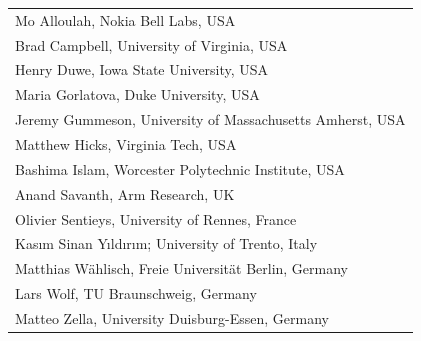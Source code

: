 \documentclass[a4paper,10pt]{scrartcl}
\begin{document}
\begin{minipage}{.49\textwidth}
\begin{tcolorbox}[boxsep=0pt, top=2mm, left=2mm, right=2mm, bottom=0mm, arc=5pt, auto outer arc, colback=cfp_lightcolor, colframe=white]
  \vskip1mm
  \begin{tabular}{l}
Mo Alloulah, Nokia Bell Labs, USA \\
Brad Campbell, University of Virginia, USA \\
Henry Duwe, Iowa State University, USA \\
Maria Gorlatova, Duke University, USA \\
Jeremy Gummeson, University of Massachusetts Amherst, USA \\
Matthew Hicks, Virginia Tech, USA \\
Bashima Islam, Worcester Polytechnic Institute, USA \\
Anand Savanth, Arm Research, UK \\
Olivier Sentieys, University of Rennes, France \\
Kasım Sinan Yıldırım; University of Trento, Italy \\
Matthias Wählisch, Freie Universität Berlin, Germany \\
Lars Wolf, TU Braunschweig, Germany \\
Matteo Zella, University Duisburg-Essen, Germany \\
  \end{tabular}
  \vspace{1mm}
\end{tcolorbox}
\end{minipage}
\hfill
\end{document}
